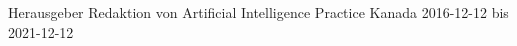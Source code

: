 


\begin{cvhonors}




\cvhonor
{Herausgeber} %
{Redaktion von Artificial Intelligence Practice} %
{Kanada} %
{2016-12-12 bis 2021-12-12} %



\end{cvhonors}
